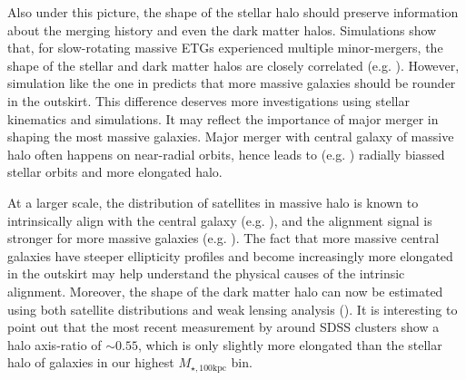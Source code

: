 \documentclass[a4paper,fleqn,usenatbib]{mnras}
\def\mtot{{$M_{\star,100\mathrm{kpc}}$}}
\begin{document}
    Also under this picture, the shape of the stellar halo should preserve information
    about the merging history and even the dark matter halos. 
    Simulations show that, for slow-rotating massive ETGs experienced multiple 
    minor-mergers, the shape of the stellar and dark matter halos are closely 
    correlated (e.g. \citealt{Wu2014}). 
    However, simulation like the one in \citet{Wu2014} predicts that more massive 
    galaxies should be rounder in the outskirt.
    This difference deserves more investigations using stellar kinematics and 
    simulations. 
    It may reflect the importance of major merger in shaping the most massive 
    galaxies. 
    Major merger with central galaxy of massive halo often happens on near-radial 
    orbits, hence leads to (e.g. \citealt{Murante2007}) radially biassed stellar 
    orbits and more elongated halo. 
    
    At a larger scale, the distribution of satellites in massive halo is known to 
    intrinsically align with the central galaxy (e.g. \citealt{Brainerd2005, 
    Yang2006b, NiedersteOstholt2010, HuangMandelbaum2016}), and the alignment signal
    is stronger for more massive galaxies (e.g. \citealt{Hirata2007}).
    The fact that more massive central galaxies have steeper ellipticity profiles 
    and become increasingly more elongated in the outskirt may help understand 
    the physical causes of the intrinsic alignment. 
    Moreover, the shape of the dark matter halo can now be estimated using both 
    satellite distributions and weak lensing analysis (\citealt{ClampittJain2016}). 
    It is interesting to point out that the most recent measurement by 
    \citet{Shin2017} around SDSS clusters show a halo axis-ratio of ${\sim}0.55$, 
    which is only slightly more elongated than the stellar halo of galaxies in our 
    highest \mtot{} bin.
    
    

\end{document}
